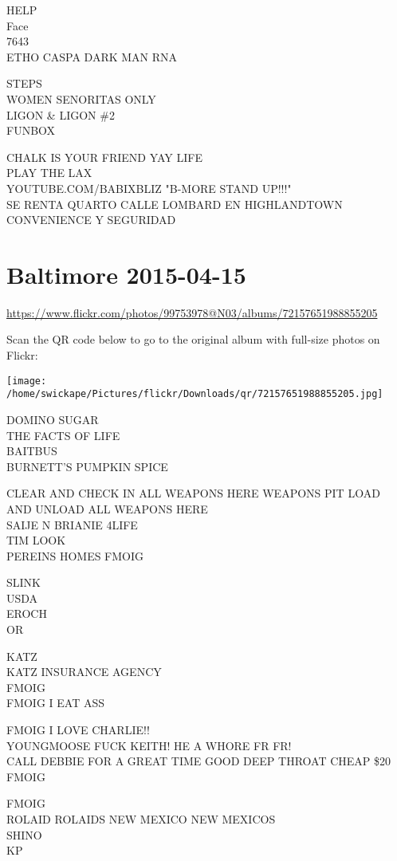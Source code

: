 \documentclass[10pt,letterpaper]{article}
\begin{document}
HELP\\
Face\\
7643\\
ETHO CASPA DARK MAN RNA

STEPS\\
WOMEN SENORITAS ONLY\\
LIGON \& LIGON \#2\\
FUNBOX

CHALK IS YOUR FRIEND YAY LIFE\\
PLAY THE LAX\\
YOUTUBE.COM/BABIXBLIZ "B{-}MORE STAND UP!!!"\\
SE RENTA QUARTO CALLE LOMBARD EN HIGHLANDTOWN CONVENIENCE Y SEGURIDAD


\section*{Baltimore 2015-04-15}

\url{https://www.flickr.com/photos/99753978@N03/albums/72157651988855205}

Scan the QR code below to go to the original album with full-size photos on Flickr:

\texttt{[image: /home/swickape/Pictures/flickr/Downloads/qr/72157651988855205.jpg]}


DOMINO SUGAR\\
THE FACTS OF LIFE\\
BAITBUS\\
BURNETT'S PUMPKIN SPICE

CLEAR AND CHECK IN ALL WEAPONS HERE WEAPONS PIT LOAD AND UNLOAD ALL WEAPONS HERE\\
SAIJE N BRIANIE 4LIFE\\
TIM LOOK\\
PEREINS HOMES FMOIG

SLINK\\
USDA\\
EROCH\\
OR

KATZ\\
KATZ INSURANCE AGENCY\\
FMOIG\\
FMOIG I EAT ASS

FMOIG I LOVE CHARLIE!!\\
YOUNGMOOSE FUCK KEITH! HE A WHORE FR FR!\\
CALL DEBBIE FOR A GREAT TIME GOOD DEEP THROAT CHEAP \$20\\
FMOIG

FMOIG\\
ROLAID ROLAIDS NEW MEXICO NEW MEXICOS\\
SHINO\\
KP
\end{document}
